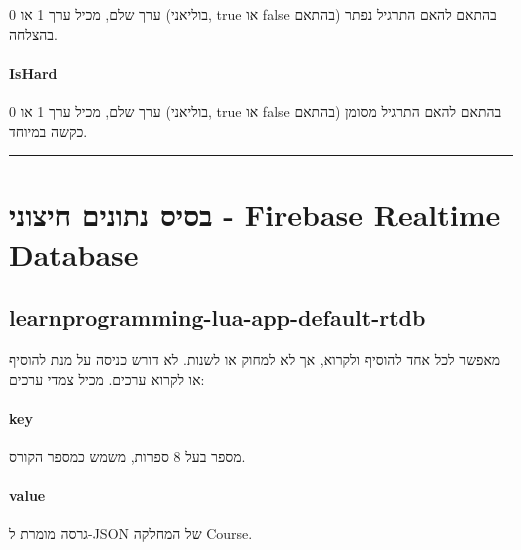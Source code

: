 ערך שלם, מכיל ערך 1 או 0 (בוליאני, true או false בהתאם) בהתאם להאם התרגיל נפתר בהצלחה.

\paragraph{IsHard}

ערך שלם, מכיל ערך 1 או 0 (בוליאני, true או false בהתאם) בהתאם להאם התרגיל מסומן כקשה במיוחד.

\noindent\rule{\textwidth}{0.4pt}

\section{בסיס נתונים חיצוני - Firebase Realtime Database}
\subsection*{learnprogramming-lua-app-default-rtdb}

מאפשר לכל אחד להוסיף ולקרוא, אך לא למחוק או לשנות.
לא דורש כניסה על מנת להוסיף או לקרוא ערכים.
מכיל צמדי ערכים:

\paragraph{key} מספר בעל 8 ספרות, משמש כמספר הקורס.
\paragraph{value} גרסה מומרת ל-JSON של המחלקה Course.